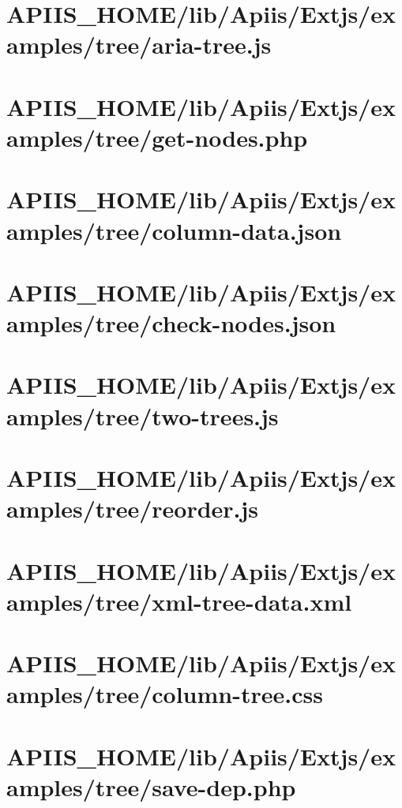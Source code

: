 \section{APIIS\_HOME/lib/Apiis/Extjs/examples/tree/aria-tree.js} 
\section{APIIS\_HOME/lib/Apiis/Extjs/examples/tree/get-nodes.php} 
\section{APIIS\_HOME/lib/Apiis/Extjs/examples/tree/column-data.json} 
\section{APIIS\_HOME/lib/Apiis/Extjs/examples/tree/check-nodes.json} 
\section{APIIS\_HOME/lib/Apiis/Extjs/examples/tree/two-trees.js} 
\section{APIIS\_HOME/lib/Apiis/Extjs/examples/tree/reorder.js} 
\section{APIIS\_HOME/lib/Apiis/Extjs/examples/tree/xml-tree-data.xml} 
\section{APIIS\_HOME/lib/Apiis/Extjs/examples/tree/column-tree.css} 
\section{APIIS\_HOME/lib/Apiis/Extjs/examples/tree/save-dep.php} 
